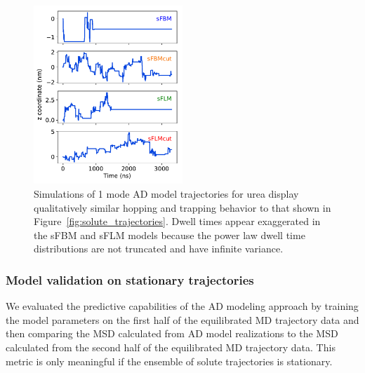 \documentclass[12pt]{article}
\begin{document}
  \begin{figure}
  \centering
  \includegraphics[width=0.5\textwidth]{ad_realizations_1mode.pdf}
  \caption{Simulations of 1 mode AD model trajectories for urea display qualitatively
  similar hopping and trapping behavior to that shown in Figure~\ref{fig:solute_trajectories}. 
  Dwell times appear exaggerated in the sFBM and sFLM models because the power law dwell
  time distributions are not truncated and have infinite variance.
  }\label{fig:ad_eyetest}
  \end{figure}
  
  \subsubsection{Model validation on stationary trajectories}\label{section:sfbm_validation}

  We evaluated the predictive capabilities of the AD modeling approach by training
  the model parameters on the first half of the equilibrated MD trajectory data and
  then comparing the MSD calculated from AD model realizations to the MSD calculated
  from the second half of the equilibrated MD trajectory data. This metric is
  only meaningful if the ensemble of solute trajectories is stationary.
  
\end{document}
